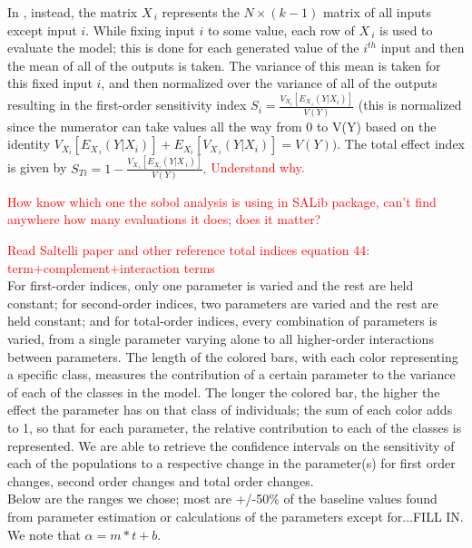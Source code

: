 \documentclass[12pt]{article}
\begin{document}
In \cite{Saltelli2}, instead, the matrix $X_{~i}$ represents the $N \times (k-1)$ matrix of all inputs except input $i.$ While fixing input $i$ to some value, each row of $X_{~i}$ is used to evaluate the model; this is done for each generated value of the $i^{th}$ input and then the mean of all of the outputs is taken. The variance of this mean is taken for this fixed input $i$, and then normalized over the variance of all of the outputs resulting in the first-order sensitivity index $S_i=\frac{V_{X_i}[E_{X_{~i}}(Y|X_i)]}{V(Y)}$ (this is normalized since the numerator can take values all the way from 0 to V(Y) based on the identity $V_{X_i}[E_{X_{~i}}(Y|X_i)]+E_{X_i}[V_{X_{~i}}(Y|X_i)]=V(Y))$. The total effect index is given by $S_{Ti}=1-\frac{V_{X_{~i}}[E_{X_i}(Y|X_{~i})]}{V(Y)}.$ \textcolor{red}{Understand why.}

\textcolor{red}{How know which one the sobol analysis is using in SALib package, can't find anywhere how many evaluations it does; does it matter?}


\textcolor{red}{Read Saltelli paper and other reference total indices equation 44: term+complement+interaction terms} \\

For first-order indices, only one parameter is varied and the rest are held constant; for second-order indices, two parameters are varied and the rest are held constant; and for total-order indices, every combination of parameters is varied, from a single parameter varying alone to all higher-order interactions between parameters. The length of the colored bars, with each color representing a specific class, measures the contribution of a certain parameter to the variance of each of the classes in the model. The longer the colored bar, the higher the effect the parameter has on that class of individuals; the sum of each color adds to 1, so that for each parameter, the relative contribution to each of the classes is represented. We are able to retrieve the confidence intervals on the sensitivity of each of the populations to a respective change in the parameter(s) for first order changes, second order changes and total order changes. \\


Below are the ranges we chose; most are +/-50\% of the baseline values found from parameter estimation or calculations of the parameters except for...FILL IN. We note that $\alpha=m*t+b$. 
\end{document}
